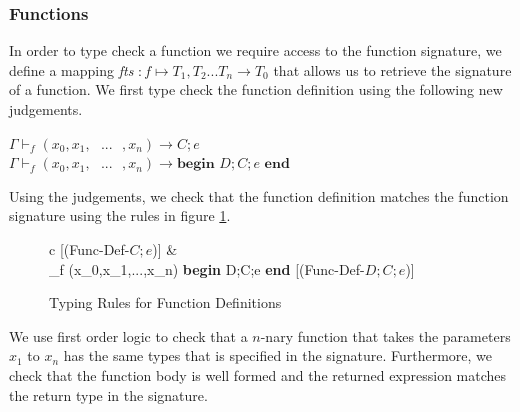 \documentclass[a4paper,12pt]{report}
\begin{document}
\subsubsection{Functions}
In order to type check a function we require access to the function signature, we define 
a mapping \textit{fts} $: f \mapsto T_1,T_2...T_n \longrightarrow T_0$ 
that allows us to retrieve the signature of a function. We first type check the 
function definition using the following new judgements.
\begin{center}
    $\Gamma \vdash_{f} (x_0,x_1,\text{ }...\text{ },x_n) \longrightarrow C;e$\\
    $\Gamma \vdash_{f} (x_0,x_1,\text{ }...\text{ },x_n) \longrightarrow \textbf{begin }D;C;e\textbf{ end}$
\end{center}

\par
Using the judgements, we check that the function definition matches the function 
signature using the rules in figure \ref{fig:type_check_f_def}.
\begin{figure}[H]
  \begin{center}
    \begin{tabular} {c}
       [(Func-Def-$C;e$)]
      & \\
      {\Gamma \vdash_{f} (x_0,x_1,\text{ }...\text{ },x_n) \longrightarrow \textbf{begin }D;C;e\textbf{ end}} [(Func-Def-$D;C;e$)]
    \end{tabular}
  \end{center}
  \caption{Typing Rules for Function Definitions}
  \label{fig:type_check_f_def}
\end{figure}

\par
We use first order logic to check that a $n$-nary function that takes 
the parameters $x_1$ to $x_n$ has the same types that is specified in the 
signature. Furthermore, we check that the function body is well formed and 
the returned expression matches the return type in the signature. 
\end{document}

